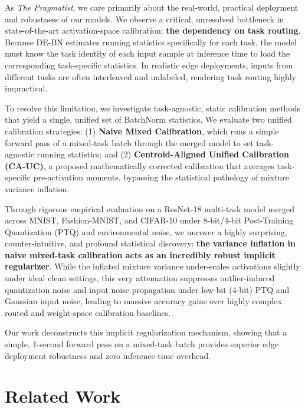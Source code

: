\documentclass{article}
\theoremstyle{plain}
\theoremstyle{definition}
\theoremstyle{remark}
\begin{document}
As \textit{The Pragmatist}, we care primarily about the real-world, practical deployment and robustness of our models. We observe a critical, unresolved bottleneck in state-of-the-art activation-space calibration: \textbf{the dependency on task routing}. Because DE-BN estimates running statistics specifically for each task, the model must know the task identity of each input sample at inference time to load the corresponding task-specific statistics. In realistic edge deployments, inputs from different tasks are often interleaved and unlabeled, rendering task routing highly impractical. 

To resolve this limitation, we investigate task-agnostic, static calibration methods that yield a single, unified set of BatchNorm statistics. We evaluate two unified calibration strategies: (1) \textbf{Naive Mixed Calibration}, which runs a simple forward pass of a mixed-task batch through the merged model to set task-agnostic running statistics; and (2) \textbf{Centroid-Aligned Unified Calibration (CA-UC)}, a proposed mathematically corrected calibration that averages task-specific pre-activation moments, bypassing the statistical pathology of mixture variance inflation.

Through rigorous empirical evaluation on a ResNet-18 multi-task model merged across MNIST, Fashion-MNIST, and CIFAR-10 under 8-bit/4-bit Post-Training Quantization (PTQ) and environmental noise, we uncover a highly surprising, counter-intuitive, and profound statistical discovery: \textbf{the variance inflation in naive mixed-task calibration acts as an incredibly robust implicit regularizer}. While the inflated mixture variance under-scales activations slightly under ideal clean settings, this very attenuation suppresses outlier-induced quantization noise and input noise propagation under low-bit (4-bit) PTQ and Gaussian input noise, leading to massive accuracy gains over highly complex routed and weight-space calibration baselines.

Our work deconstructs this implicit regularization mechanism, showing that a simple, 1-second forward pass on a mixed-task batch provides superior edge deployment robustness and zero inference-time overhead.

\section{Related Work}
\label{sec:related}
\end{document}
